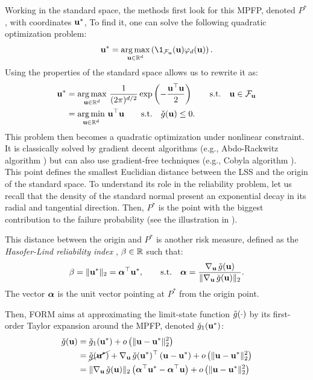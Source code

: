 Working in the standard space, the methods first look for this MPFP, denoted $P^*$, with coordinates ${\bf u}^*$, 
To find it, one can solve the following quadratic optimization problem: 
\begin{equation}
    \bu^* = \argmax_{\bu \in \R^d} \left(\1_{\iF_\bu}(\bu) \varphi_d(\bu)\right).
\end{equation}
Using the properties of the standard space allows us to rewrite it as: 
\begin{align}
    {\bf u}^* &= \operatorname*{arg\,max}_{{\bf u} \in \mathbb{R}^d} \, \frac{1}{(2\pi)^{d/2}} \exp\left(-\frac{{\bf u}^\top {\bf u} }{2} \right) \qquad \mathrm{s.t.} \quad {\bf u} \in \mathcal{F}_{{\bf u}}\\
          &= \operatorname*{arg\,min}_{{\bf u} \in \mathbb{R}^d} \, {\bf u}^\top {\bf u} \qquad \mathrm{s.t.} \quad \check{g}({\bf u}) \leq 0.
\end{align}
This problem then becomes a quadratic optimization under nonlinear constraint. 
It is classically solved by gradient decent algorithms (e.g., Abdo-Rackwitz algorithm \citep{abdo_rack_1991}) but can also use gradient-free techniques (e.g., Cobyla algorithm \citep{powell_1994}). 
This point defines the smallest Euclidian distance between the LSS and the origin of the standard space. 
To understand its role in the reliability problem, let us recall that the density of the standard normal present an exponential decay in its radial and tangential direction. 
Then, $P^*$ is the point with the biggest contribution to the failure probability (see the illustration in ). 

This distance between the origin and $P^*$ is another risk measure, defined as the \textit{Hasofer-Lind reliability index} \citep{lemaire_2013}, $\beta \in \mathbb{R}$ such that:
\begin{equation}
    \beta = \Vert {\bf u}^* \Vert_2 = {\boldsymbol{\alpha}} ^\top {\bf u}^*, \qquad \mathrm{s.t.} \quad
        {\boldsymbol{\alpha}} = \frac{\nabla_{{\bf u}} \,  \check{g}({\bf u})}{\Vert \nabla_{{\bf u}} \,  \check{g}({\bf u}) \Vert_2}.      
\end{equation}
The vector ${\boldsymbol{\alpha}}$ is the unit vector pointing at $P^*$ from the origin point. 

Then, FORM aims at approximating the limit-state function $\check{g}(\cdot)$ by its first-order Taylor expansion around the MPFP, denoted $\check{g}_1({\bf u}^*)$: 
\begin{equation}
    \begin{split}
        \check{g}({\bf u}) &= \check{g}_1({\bf u}^*) + o\left(\Vert {\bf u} - {\bf u}^* \Vert_2^2\right)\\
                 &= \cancel{\check{g}({\bf u}^*)} + \nabla_{{\bf u}} \,  \check{g}({\bf u}^*)^\top \left({\bf u} -{\bf u}^* \right) + o\left(\Vert {\bf u} - {\bf u}^* \Vert_2^2\right)\\
                 &= \Vert \nabla_{{\bf u}} \, \check{g}({\bf u}) \Vert_2 \left({\boldsymbol{\alpha}}^\top {\bf u}^* - {\boldsymbol{\alpha}}^\top {\bf u} \right) + o\left(\Vert {\bf u} - {\bf u}^* \Vert_2^2\right)
    \end{split}    
\end{equation}
 
